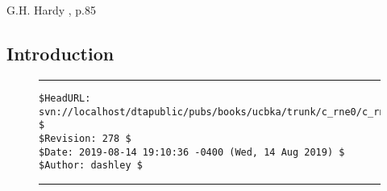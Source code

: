 
\chapter{\crnezerolongtitle{}}

\label{crne0}

                   {G.H. Hardy \cite{bibref:b:mathematiciansapology:1940},
                   p.85}

\section{Introduction}



\noindent\begin{figure}[!b]
\noindent\rule[-0.25in]{\textwidth}{1pt}
\begin{tiny}
\begin{verbatim}
$HeadURL: svn://localhost/dtapublic/pubs/books/ucbka/trunk/c_rne0/c_rne0.tex $
$Revision: 278 $
$Date: 2019-08-14 19:10:36 -0400 (Wed, 14 Aug 2019) $
$Author: dashley $
\end{verbatim}
\end{tiny}
\noindent\rule[0.25in]{\textwidth}{1pt}
\end{figure}
%
